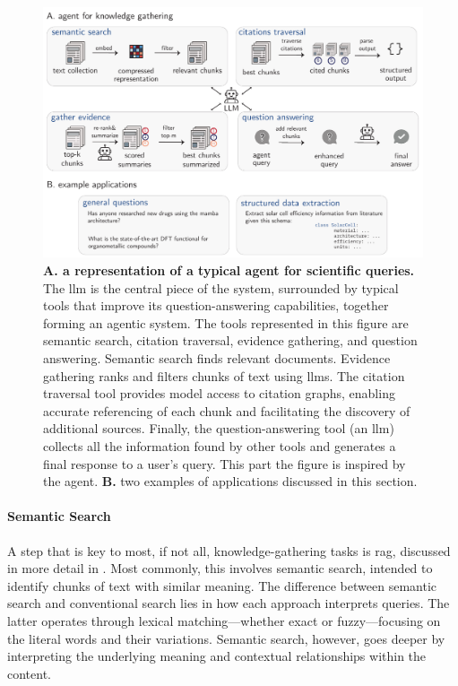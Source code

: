 \begin{figure}[!ht]
    \centering
\includegraphics[width=1\textwidth]{figures/rescaled_figures/chemrev_figure12.pdf}
    \caption{\textbf{A. a representation of a typical agent for scientific queries.} The \gls{llm} is the central piece of the system, surrounded by typical tools that improve its question-answering capabilities, together forming an agentic system. The tools represented in this figure are semantic search, citation traversal, evidence gathering, and question answering. Semantic search finds relevant documents. Evidence gathering ranks and filters chunks of text using \glspl{llm}. The citation traversal tool provides model access to citation graphs, enabling accurate referencing of each chunk and facilitating the discovery of additional sources. Finally, the question-answering tool (an \gls{llm}) collects all the information found by other tools and generates a final response to a user's query. This part the figure is inspired by the  agent.\autocite{skarlinski2024language} \textbf{B.} two examples of applications discussed in this section.}
\label{fig:knowledge_gathering}
\end{figure}


\paragraph{Semantic Search} A step that is key to most, if not all, knowledge-gathering tasks is \gls{rag}, discussed in more detail in . 
Most commonly, this involves semantic search, intended to identify chunks of text with similar meaning. 
The difference between semantic search and conventional search lies in how each approach interprets queries. The latter operates through lexical matching---whether exact or fuzzy---focusing on the literal words and their variations. Semantic search, however, goes deeper by interpreting the underlying meaning and contextual relationships within the content. 

